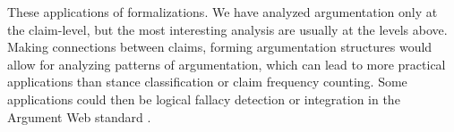 These applications of formalizations. We have analyzed argumentation only at the 
claim-level, but the most interesting analysis are usually at the levels above. 
Making connections between claims, forming argumentation structures would allow
for analyzing patterns of argumentation, which can lead to 
more practical applications
than stance classification or claim frequency counting. Some applications could then 
be logical fallacy detection or integration in the Argument Web standard
\citep{rahwan2007laying}.


